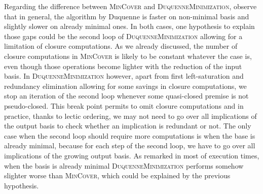\vspace{1.2em}

Regarding the difference between \textsc{MinCover} and \textsc{DuquenneMinimization}, observe that in general, the algorithm by Duquenne is faster on non-minimal basis and slightly slower on already minimal ones. In both cases, one hypothesis to explain those gaps could be the second
loop of \textsc{DuquenneMinimization} allowing for a limitation of closure computations. As we already discussed, the number of closure computations in 
\textsc{MinCover} is likely to be constant whatever the case is, even though
those operations become lighter with the reduction of the input basis. In \textsc{DuquenneMinimization} however, apart from first left-saturation and
redundancy elimination allowing for some savings in closure computations, we stop an iteration of the second loop whenever some quasi-closed premise is not
pseudo-closed. This break point permits to omit closure computations and in practice, thanks to lectic ordering, we may not need to go over all implications of the output basis to check whether an implication is redundant or not. The only case when the second loop should require more computations is when the base is already minimal, because for each step of the second loop, we have to go over all implications of the growing output basis. As remarked in most of execution times, when the basis is already minimal \textsc{DuquenneMinimization} performs somehow slighter worse than 
\textsc{MinCover}, which could be explained by the previous hypothesis.

